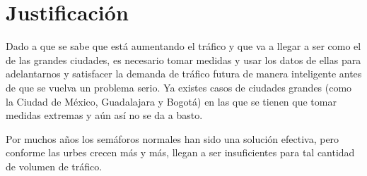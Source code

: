 \hypertarget{justificaciuxf3n}{%
\section{Justificación}\label{justificaciuxf3n}}

Dado a que se sabe que está aumentando el tráfico y que va a llegar a
ser como el de las grandes ciudades, es necesario tomar medidas y usar
los datos de ellas para adelantarnos y satisfacer la demanda de tráfico
futura de manera inteligente antes de que se vuelva un problema serio.
Ya existes casos de ciudades grandes (como la Ciudad de México,
Guadalajara y Bogotá) en las que se tienen que tomar medidas extremas y
aún así no se da a basto.

Por muchos años los semáforos normales han sido una solución efectiva,
pero conforme las urbes crecen más y más, llegan a ser insuficientes
para tal cantidad de volumen de tráfico.

\clearpage %
